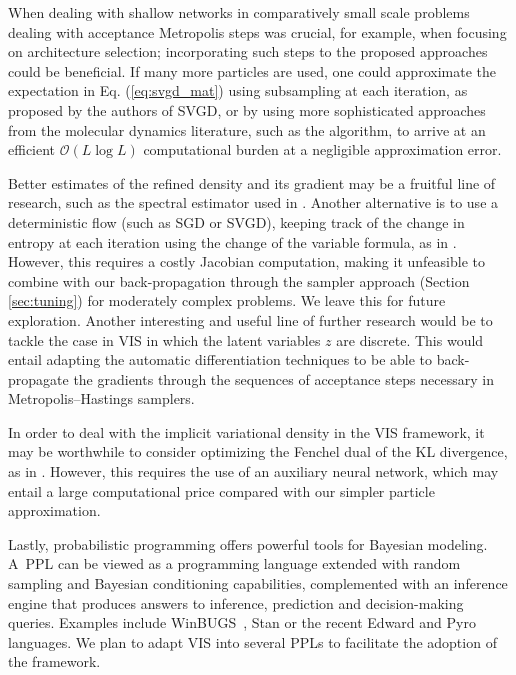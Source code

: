 When dealing with shallow networks in comparatively small scale problems
\parencite{muller1998issues} dealing with acceptance Metropolis steps was crucial, for example,
when focusing on architecture selection; incorporating such steps
to the proposed approaches could be beneficial. 
If many more particles are  used, one could approximate the expectation in Eq.  (\ref{eq:svgd_mat}) using subsampling at each iteration, as proposed by the authors of SVGD, or by using more sophisticated approaches from the molecular dynamics literature, such as the \cite{barnes1986hierarchical} algorithm, to arrive at an efficient $\mathcal{O}(L \log L)$ computational burden at a negligible approximation error.

Better estimates of the refined density and its gradient may be a fruitful line of research, such as the spectral estimator used in \cite{shi2018spectral}. Another alternative is to use a deterministic flow (such as SGD or SVGD), keeping
track of the change in entropy at each iteration using the change of the variable formula, as in \cite{duvenaud2016early}. However, this requires a costly Jacobian computation, making it unfeasible to combine with our  back-propagation through the sampler approach (Section \ref{sec:tuning}) for moderately complex problems. We leave this for future exploration. {Another interesting and useful line of further research would be to tackle the case in VIS in which the latent variables $z$ are discrete. This would entail adapting the automatic differentiation techniques to be able to back-propagate the gradients through the sequences of acceptance steps necessary in Metropolis--Hastings samplers.}

In order to deal with the implicit variational density in the VIS framework, it may be worthwhile to consider optimizing the Fenchel dual of the KL divergence, as
 in \parencite{fang2019implicit}. However, this requires the use of an auxiliary neural network, which may entail a large computational price compared with our simpler particle approximation.

Lastly, probabilistic programming offers powerful tools for Bayesian modeling.
A~PPL can be viewed as a programming language extended with random sampling and Bayesian conditioning capabilities, complemented with an inference engine that produces answers to inference, prediction and decision-making queries. Examples 
include WinBUGS~\parencite{lunn2000winbugs}, Stan \parencite{carpenter2017stan} or the recent Edward \parencite{tran2018simple} and Pyro \parencite{bingham2018pyro} languages. We plan to adapt VIS into several PPLs to facilitate the adoption of the framework.

